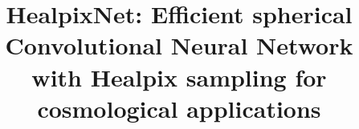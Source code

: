\documentclass[final,twocolumn,3p,times,authoryear]{elsarticle}
\newcommand{\1}{\b{1}}              %
\newcommand{\0}{\b{0}}              %
\begin{document}
\begin{frontmatter}



\title{HealpixNet: Efficient spherical Convolutional Neural Network with Healpix sampling for cosmological applications}


\author{}

\address{}

\begin{abstract}




\end{abstract}
\end{frontmatter}
\end{document}

